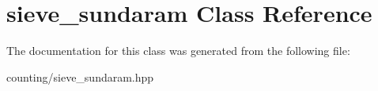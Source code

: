 \hypertarget{classsieve__sundaram}{}\section{sieve\+\_\+sundaram Class Reference}
\label{classsieve__sundaram}


The documentation for this class was generated from the following file\+:\begin{DoxyCompactItemize}
\item 
counting/sieve\+\_\+sundaram.\+hpp\end{DoxyCompactItemize}
